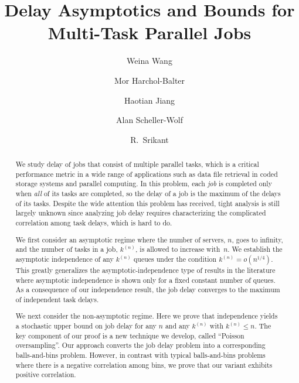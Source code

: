 \documentclass[sigconf]{acmart}
\newcommand{\supn}{^{(n)}}
\begin{document}
\title{Delay Asymptotics and Bounds for Multi-Task Parallel Jobs}

\author{Weina Wang}

\author{Mor Harchol-Balter}

\author{Haotian Jiang}


\author{Alan Scheller-Wolf}

\author{R.\ Srikant}

\begin{abstract}
We study delay of jobs that consist of multiple parallel tasks, which is a critical performance metric in a wide range of applications such as data file retrieval in coded storage systems and parallel computing.  In this problem, each \emph{job} is completed only when \emph{all} of its tasks are completed, so the delay of a job is the maximum of the delays of its tasks. Despite the wide attention this problem has received, tight analysis is still largely unknown since analyzing job delay requires characterizing the complicated correlation among task delays, which is hard to do.

We first consider an asymptotic regime where the number of servers, $n$, goes to infinity, and the number of tasks in a job, $k\supn$, is allowed to increase with~$n$.  We establish the asymptotic independence of any $k\supn$ queues under the condition $k\supn = o(n^{1/4})$. This greatly generalizes the asymptotic-independence type of results in the literature where asymptotic independence is shown only for a fixed constant number of queues.  As a consequence of our independence result, the job delay converges to the maximum of independent task delays.

We next consider the non-asymptotic regime.  Here we prove that independence yields a stochastic upper bound on job delay for any $n$ and any $k\supn$ with $k\supn\le n$.  The key component of our proof is a new technique we develop, called ``Poisson oversampling''.  Our approach converts the job delay problem into a corresponding balls-and-bins problem.  However, in contrast with typical balls-and-bins problems where there is a negative correlation among bins, we prove that our variant exhibits positive correlation.
\end{abstract}
\end{document}
